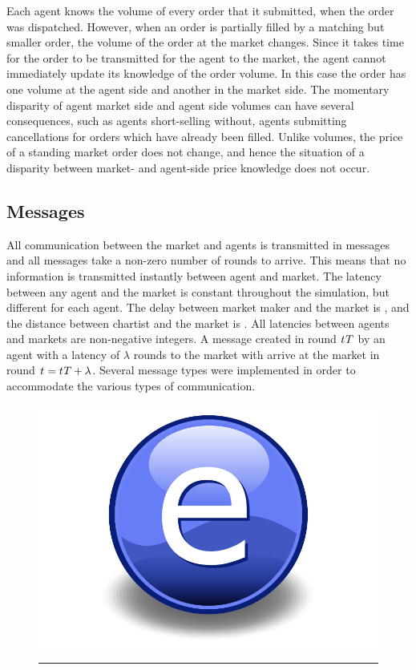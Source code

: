 Each agent knows the volume of every order that it submitted, when the order was dispatched. However, when an order is partially filled by a matching but smaller order, the volume of the order at the market changes. Since it takes time for the order to be transmitted for the agent to the market, the agent cannot immediately update its knowledge of the order volume. In this case the order has one volume at the agent side and another in the market side. The momentary disparity of agent market side and agent side volumes can have several consequences, such as agents short-selling without, agents submitting cancellations for orders which have already been filled. Unlike volumes, the price of a standing market order does not change, and hence the situation of a disparity between market- and agent-side price knowledge does not occur.





\subsection{Messages}
All communication between the market and agents is transmitted in messages and all messages take a non-zero number of rounds to arrive. This means that no information is transmitted instantly between agent and market. The latency between any agent and the market is constant throughout the simulation, but different for each agent. The delay between market maker  and the market is , and the distance between chartist  and the market is . All latencies between agents and markets are non-negative integers. A message created in round $t_{}{T}$ by an agent with a latency of $\lambda$ rounds to the market with arrive at the market in round $t_{} = t_{}{T} + \lambda$. Several message types were implemented in order to accommodate the various types of communication.

\begin{figure}[htbp]
	\centering
		\includegraphics{Figures/Electron.pdf}
		\rule{35em}{0.5pt}
	\caption{}
	\label{fig:information_exchange}
\end{figure}


